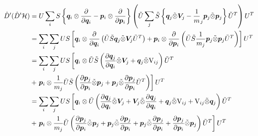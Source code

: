 \documentclass[11pt,a4paper,uplatex]{jsarticle}
\begin{document}
\begin{align}
    \hat{D}'(\hat{D}'{\cal H}) &= U \sum_{i} S \left\{ 
        \bm{q}_{i} \otimes \frac{\partial }{\partial \bm{q}_{i}} - \bm{p}_{i} \otimes \frac{\partial }{\partial \bm{p}_{i} } 
        \right\} 
         \left( \tilde{U} \sum_{j} \tilde{S} \left\{
    \bm{q}_{j} \tilde{\otimes} \bm{V}_{j} - \frac{1}{m}_{j} \bm{p}_{j} \tilde{\otimes} \bm{p}_{j}    
    \right\} \tilde{U}^{T} \right)
    U^{T}\\
    &= \sum_{i} \sum_{j} U S \left[ 
        \bm{q}_{i} \otimes \frac{\partial}{\partial \bm{q}_{i}} \left(
        \tilde{U} \tilde{S} \bm{q}_{j} \tilde{\otimes} \bm{V}_{j} \tilde{U}^{T}
         \right)
         + \bm{p}_{i} \otimes \frac{\partial}{\partial \bm{p}_{i}} \left(\tilde{U} \tilde{S} \frac{1}{m_{j}}\bm{p}_{j} \tilde{\otimes} \bm{p}_{j} \tilde{U}^{T} \right)
    \right] U^{T} \\
    &= \sum_{i}\sum_{j} U S \left[
        \bm{q}_{i} \otimes 
            \tilde{U} \tilde{S}\left( \frac{\partial \bm{q}_{j}}{\partial \bm{q}_{i}} \tilde{\otimes} \bm{V}_{j} 
            + \bm{q}_{j} \tilde{\otimes} {\rm V}_{i
            j} \right) \tilde{U}^{T}
            \right. \\
     &+ \left. \bm{p}_{i} \otimes \frac{1}{m_{j}} \tilde{U} \tilde{S} \left( 
         \frac{\partial \bm{p}_{j}} {\partial \bm{p}_{i}} \tilde{\otimes} \bm{p}_{j} 
         + \bm{p}_{j}  \tilde{\otimes} \frac{\partial \bm{p}_{j} } {\partial \bm{p}_{i}}
         \tilde{U}^{T} \right)
        \right] U^{T} \\
    &= \sum_{i}\sum_{j} U S \left[
            \bm{q}_{i} \otimes 
                \tilde{U} \left( \frac{\partial \bm{q}_{j}}{\partial \bm{q}_{i}} \tilde{\otimes} \bm{V}_{j} 
                +  \bm{V}_{j} \tilde{\otimes}\frac{\partial \bm{q}_{j}}{\partial \bm{q}_{i}} 
                + \bm{q}_{j} \tilde{\otimes} {\rm V}_{ij}
                + {\rm V}_{ij}\tilde{\otimes} \bm{q}_{j} 
                 \right) \tilde{U}^{T}
                \right. \\
    &+ \left. \bm{p}_{i} \otimes \frac{1}{m_{j}} \tilde{U}  \left( 
             \frac{\partial \bm{p}_{j}} {\partial \bm{p}_{i}} \tilde{\otimes} \bm{p}_{j} 
             + \bm{p}_{j}  \tilde{\otimes} \frac{\partial \bm{p}_{j}} {\partial \bm{p}_{i}}
             + \bm{p}_{j}  \tilde{\otimes} \frac{\partial \bm{p}_{j} } {\partial \bm{p}_{i}}
             + \frac{\partial \bm{p}_{j} } {\partial \bm{p}_{i}} \tilde{\otimes} \bm{p}_{j}
              \right) \tilde{U}^{T}
            \right] U^{T} \\

\end{align}
\end{document}
